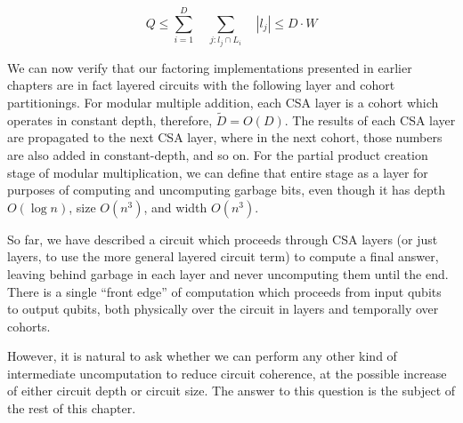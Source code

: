 \begin{equation}
Q \le \sum_{i=1}^{D} \quad \sum_{j: l_j \cap L_i} \quad |l_j| \le D\cdot W
\end{equation}



We can now verify that our factoring implementations presented in earlier
chapters are in fact layered circuits with the following layer and cohort
partitionings. For modular multiple addition,
each CSA layer is a cohort
which operates in constant depth, therefore, $\tilde{D} = O(D)$.
The results of
each CSA layer are propagated to the next CSA layer, where in the next cohort,
those numbers are also added in constant-depth, and so on.
For the partial product creation stage of modular multiplication, we can
define that entire stage as a layer for purposes of computing and uncomputing
garbage bits, even though it has depth $O(\log n)$, size $O(n^3)$, and
width $O(n^3)$.

So far, we have described a circuit which proceeds through CSA layers
(or just layers, to use the more general layered circuit term) to compute
a final answer, leaving behind garbage in each layer and never uncomputing
them until the end.
There is a single ``front edge'' of computation which
proceeds from input qubits to output qubits, both physically over the
circuit in layers and temporally over cohorts.

However,
it is natural to ask whether we
can perform any other kind of intermediate uncomputation to reduce
circuit coherence, at the possible increase of either circuit depth
or circuit size. The answer to this question is the subject of the
rest of this chapter.



